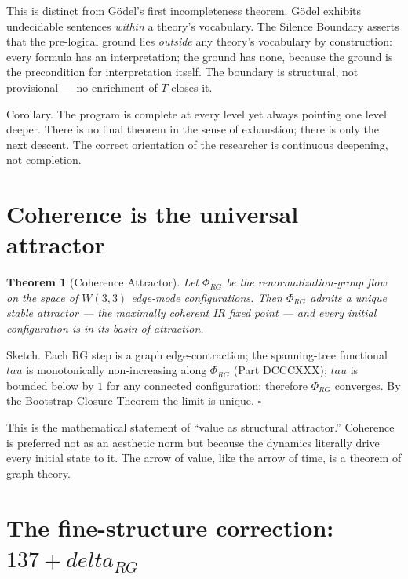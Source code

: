 \documentclass[11pt]{article}
\def\mathrm#1{#1}%
\def\textbf#1{#1}%
\def\delta{delta}%
\def\Phi#1{Phi#1}%
\def\tau{tau}%
\newtheorem*{theorem}{Theorem}
\begin{document}
This is distinct from Gödel's first incompleteness theorem. Gödel exhibits undecidable sentences \emph{within} a theory's vocabulary. The Silence Boundary asserts that the pre-logical ground lies \emph{outside} any theory's vocabulary by construction: every formula has an interpretation; the ground has none, because the ground is the precondition for interpretation itself. The boundary is structural, not provisional --- no enrichment of $T$ closes it.

\medskip

\textbf{Corollary.} The program is complete at every level yet always pointing one level deeper. There is no final theorem in the sense of exhaustion; there is only the next descent. The correct orientation of the researcher is continuous deepening, not completion.

\section{Coherence is the universal attractor}

\begin{theorem}[Coherence Attractor]
Let $\Phi_{\mathrm{RG}}$ be the renormalization-group flow on the space of $W(3,3)$ edge-mode configurations. Then $\Phi_{\mathrm{RG}}$ admits a unique stable attractor --- the maximally coherent IR fixed point --- and every initial configuration is in its basin of attraction.
\end{theorem}

\textbf{Sketch.} Each RG step is a graph edge-contraction; the spanning-tree functional $\tau$ is monotonically non-increasing along $\Phi_{\mathrm{RG}}$ (Part DCCCXXX); $\tau$ is bounded below by $1$ for any connected configuration; therefore $\Phi_{\mathrm{RG}}$ converges. By the Bootstrap Closure Theorem the limit is unique. $\square$

This is the mathematical statement of ``value as structural attractor.'' Coherence is preferred not as an aesthetic norm but because the dynamics literally drive every initial state to it. The arrow of value, like the arrow of time, is a theorem of graph theory.

\section{\texorpdfstring{The fine-structure correction: $137 + \delta_{\mathrm{RG}}$}{The fine-structure correction: 137 + delta_RG}}

\label{sec:fine-structure-correction}
\end{document}
